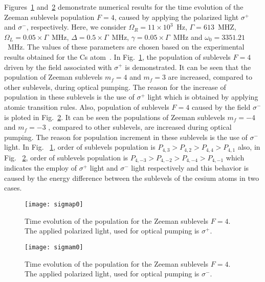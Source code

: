 \documentclass[a4paper]{article}
\begin{document}
Figures~\ref{f4} and~\ref{f5} demonstrate numerical results for the time evolution of the Zeeman sublevels population $F=4$, caused by applying the polarized light $\sigma^+$ and $\sigma^-$, respectively. Here, we consider $\Omega_R=11\times 10^3$~Hz, $\Gamma=613$~MHZ, $\Omega_L=0.05\times \Gamma$~MHz, $\Delta=0.5\times \Gamma$~MHz, $\gamma=0.05\times \Gamma$~MHz and $\omega_0=3351.21$~MHz.
The values of these parameters are chosen based on the experimental results obtained for the Cs atom~\cite{r23}.
In Fig.~\ref{f4}, the population of sublevels $F=4$ driven by the field associated with $\sigma^+$ is demonstrated. It can be seen that the population of  Zeeman  sublevels $m_f=4$ and $m_f=3$  are increased, compared to other sublevels, during optical pumping. The reason for the increase of population in these sublevels is the use of $\sigma^+$ light which is obtained by applying atomic transition rules\cite{r24}. Also, population of sublevels $F=4$ caused by the field $\sigma^-$ is ploted in Fig.~\ref{f5}.  It can be seen the populations of  Zeeman  sublevels $m_f=-4$ and $m_f=-3$ , compared to other sublevels, are increased during optical pumping. The reason for population increment in these sublevels is the use of $\sigma^-$ light.
In Fig. ~\ref{f4}, order of sublevels population is $P_{4,3}>P_{4,2}>P_{4,4}>P_{4,1}$ also, in Fig. ~\ref{f5}, order of sublevels population is $P_{4,-3}>P_{4,-2}>P_{4,-4}>P_{4,-1}$ which indicates the employ of $\sigma^+$ light  and $\sigma^-$ light   respectively and this behavior is caused by the energy difference between the sublevels of the cesium atoms in two cases.
\begin{figure}[h!]
\centering
\texttt{[image: sigmap0]}
\caption{Time evolution of the population for the Zeeman sublevels $F=4$. The applied polarized light, used for optical pumping is  $\sigma^+$. }\label{f4}
\end{figure}
\begin{figure}[h!]
\centering
\texttt{[image: sigmam0]}
\caption{Time evolution of the population for the Zeeman sublevels $F=4$. The applied polarized light, used for optical pumping is  $\sigma^-$. }\label{f5}
\end{figure}
\end{document}
